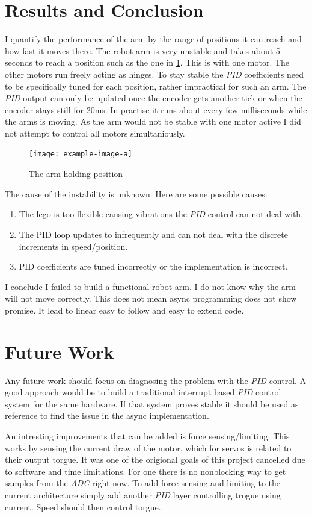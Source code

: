 \documentclass[lang=en, hanging-titles=true]{skrapport}
\begin{document}
\section{Results and Conclusion}
\label{sec:results}
I quantify the performance of the arm by the range of positions it can reach and how fast it moves there. The robot arm is very unstable and takes about 5 seconds to reach a position such as the one in \cref{fig:pos}. This is with one motor. The other motors run freely acting as hinges. To stay stable the \textit{PID} coefficients need to be specifically tuned for each position, rather impractical for such an arm. The \textit{PID} output can only be updated once the encoder gets another tick or when the encoder stays still for 20ms. In practise it runs about every few milliseconds while the arms is moving. As the arm would not be stable with one motor active I did not attempt to control all motors simultaniously.
%
\begin{figure}
	\centering
	\texttt{[image: example-image-a]}
	\caption{The arm holding position}
	\label{fig:pos}
\end{figure}
%

The cause of the instability is unknown. Here are some possible causes: 
\begin{enumerate}
	\item The lego is too flexible causing vibrations the \textit{PID} control can not deal with. 
	\item The PID loop updates to infrequently and can not deal with the discrete increments in speed/position.
	\item PID coefficients are tuned incorrectly or the implementation is incorrect.
\end{enumerate}
%
I conclude I failed to build a functional robot arm. I do not know why the arm will not move correctly. This does not mean async programming does not show promise. It lead to linear easy to follow and easy to extend code.

\section{Future Work}
Any future work should focus on diagnosing the problem with the \textit{PID} control. A good approach would be to build a traditional interrupt based \textit{PID} control system for the same hardware. If that system proves stable it should be used as reference to find the issue in the async implementation. 

An intresting improvements that can be added is force sensing/limiting. This works by sensing the current draw of the motor, which for servos is related to their output torgue. It was one of the origional goals of this project cancelled due to software and time limitations. For one there is no nonblocking way to get samples from the \textit{ADC} right now. To add force sensing and limiting to the current architecture simply add another \textit{PID} layer controlling trogue using current. Speed should then control torgue.
\end{document}
